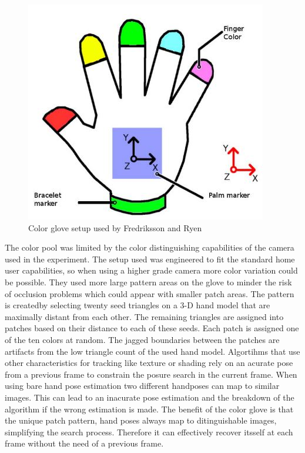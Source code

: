 \begin{figure}
\includegraphics[scale=0.61]{images/fredrikkson_color_glove.JPG}
\caption{Color glove setup used by Fredriksson and Ryen \cite{Fredriksson.2008} }
\label{wang color glove}
\end{figure}
 The color pool was limited by the color distinguishing capabilities of the camera used in the experiment. The setup used was engineered to fit the standard home user capabilities, so when using a higher grade camera more color variation could be possible. They used more large pattern areas on the glove to minder the risk of occlusion problems which could appear with smaller patch areas.
The pattern is createdby selecting twenty seed triangles on a 3-D hand model that are maximally distant from each other. The remaining triangles are assigned into patches based on their distance to each of these seeds. Each patch is assigned one of the ten colors at random. The jagged boundaries between the patches are artifacts from the low triangle count of the used hand model.
Algortihms that use other characteristics for tracking like texture or shading \cite{LaGorce.2008} rely on an acurate pose from a previous frame to constrain the posure search in the current frame. When using bare hand pose estimation two different handposes can map to similar images. This can lead to an inacurate pose estimation and the breakdown of the algorithm if the wrong estimation is made.
The benefit of the color glove is that the unique patch pattern, hand poses always map to ditinguishable images, simplifying the search process. Therefore it can effectively recover itsself at each frame without the need of a previous frame.

